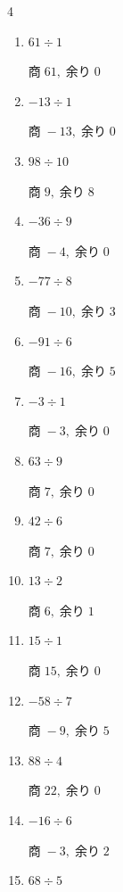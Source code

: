 \begin{multicols}{4}
\begin{enumerate}
        $商\; -12,\; 余り\; 3$

  \item $61 \div 1$

        $商\; 61,\; 余り\; 0$

  \item $-13 \div 1$

        $商\; -13,\; 余り\; 0$

  \item $98 \div 10$

        $商\; 9,\; 余り\; 8$

  \item $-36 \div 9$

        $商\; -4,\; 余り\; 0$

  \item $-77 \div 8$

        $商\; -10,\; 余り\; 3$

  \item $-91 \div 6$

        $商\; -16,\; 余り\; 5$

  \item $-3 \div 1$

        $商\; -3,\; 余り\; 0$

  \item $63 \div 9$

        $商\; 7,\; 余り\; 0$

  \item $42 \div 6$

        $商\; 7,\; 余り\; 0$

  \item $13 \div 2$

        $商\; 6,\; 余り\; 1$

  \item $15 \div 1$

        $商\; 15,\; 余り\; 0$

  \item $-58 \div 7$

        $商\; -9,\; 余り\; 5$

  \item $88 \div 4$

        $商\; 22,\; 余り\; 0$

\columnbreak %

  \item $-16 \div 6$

        $商\; -3,\; 余り\; 2$

  \item $68 \div 5$


\end{enumerate}
\end{multicols}
